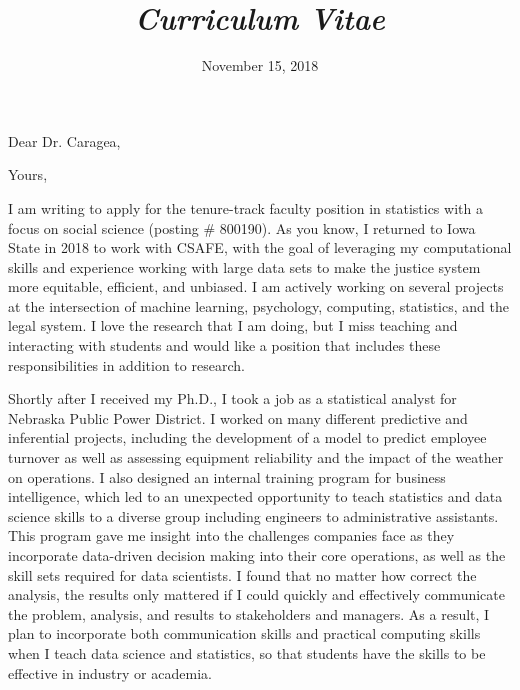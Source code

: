 \documentclass[12pt, letterpaper, sans]{moderncv}
\title{\emph{Curriculum Vitae}}
\begin{document}
\date{November 15, 2018}
\opening{Dear Dr. Caragea,}
\closing{Yours,}
\makelettertitle

I am writing to apply for the tenure-track faculty position in statistics with a focus on social science (posting \# 800190). As you know, I returned to Iowa State in 2018 to work with CSAFE, with the goal of leveraging my computational skills and experience working with large data sets to make the justice system more equitable, efficient, and unbiased. I am actively working on several projects at the intersection of machine learning, psychology, computing, statistics, and the legal system. I love the research that I am doing, but I miss teaching and interacting with students and would like a position that includes these responsibilities in addition to research. 

Shortly after I received my Ph.D., I took a job as a statistical analyst for Nebraska Public Power District. I worked on many different predictive and inferential projects, including the development of a model to predict employee turnover as well as assessing equipment reliability and the impact of the weather on operations. I also designed an internal training program for business intelligence, which led to an unexpected opportunity to teach statistics and data science skills to a diverse group including engineers to administrative assistants. This program gave me insight into the challenges companies face as they incorporate data-driven decision making into their core operations, as well as the skill sets required for data scientists. I found that no matter how correct the analysis, the results only mattered if I could quickly and effectively communicate the problem, analysis, and results to stakeholders and managers. As a result, I plan to incorporate both communication skills and practical computing skills when I teach data science and statistics, so that students have the skills to be effective in industry or academia. 
\end{document}
